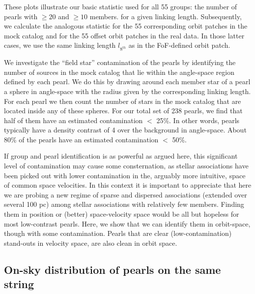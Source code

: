 \documentclass[twocolumn]{aastex631}
\begin{document}
These plots illustrate our basic statistic used for all 55 groups: the number of pearls with $\ge 20$ and $\ge 10$ members. for a given linking length. Subsequently, we calculate the analogous statistic for the 55 corresponding orbit patches in the mock catalog and for the 55 offset orbit patches in the real data. In those latter cases, we use the same linking length $l_{8^{th}}$ as in the FoF-defined orbit patch.

We investigate the ``field star'' contamination of the pearls by identifying the number of sources in the mock catalog that lie within the angle-space region defined by each pearl. We do this by drawing around each member star of a pearl a sphere in angle-space with the radius given by the corresponding linking length. For each pearl we then count the number of stars in the mock catalog that are located inside any of these spheres. For our total set of 238 pearls, we find that half of them have an estimated contamination $<$ 25\%. In other words, pearls typically have a density contrast of 4 over the background in angle-space. About 80\% of the pearls have an estimated contamination $<$ 50\%. 

If group and pearl identification is as powerful as argued here, this significant level of contamination may cause some consternation, as stellar associations have been picked out with lower contamination in the, arguably more intuitive, space of common space velocities. In this context it is important to appreciate that here we are probing a new regime of sparse and dispersed associations (extended over several 100 pc) among stellar associations with relatively few members. Finding them in position or (better) space-velocity space would be all but hopeless for most low-contrast pearls. Here, we show that we can identify them in orbit-space, though with some contamination. Pearls that are clear (low-contamination) stand-outs in velocity space, are also clean in orbit space.

\subsection{On-sky distribution of pearls on the same string}
\end{document}
